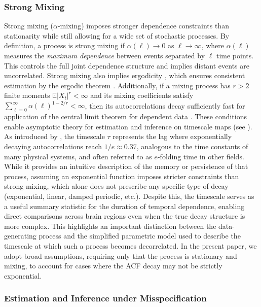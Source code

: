 \documentclass[docs/main.tex]{subfiles}
\begin{document}
\subsubsection{Strong Mixing} \label{sec:strong-mixing}
Strong mixing ($\alpha$-mixing) imposes stronger dependence constraints than stationarity while still allowing for a wide set of stochastic processes. By definition, a process is strong mixing if $\alpha(\ell) \rightarrow 0$ as $\ell \rightarrow \infty$, where $\alpha(\ell)$ measures the \emph{maximum dependence} between events separated by $\ell$ time points. This controls the full joint dependence structure and implies distant events are uncorrelated. Strong mixing also implies ergodicity \citep[Chapter~14.12]{hansen_econometrics_2022}, which ensures consistent estimation by the ergodic theorem \citep[Theorem~14.9]{hansen_econometrics_2022}. Additionally, if a mixing process has $r>2$ finite moments $\mathbb{E}|X_t|^r < \infty$ and its mixing coefficients satisfy $\sum_{\ell=0}^{\infty} \alpha(\ell)^{1-2/r} < \infty$, then its autocorrelations decay sufficiently fast for application of the central limit theorem for dependent data \citep[Theorem~14.15]{hansen_econometrics_2022}. These conditions enable asymptotic theory for estimation and inference on timescale maps (see ).\\

As introduced by \citet{murray_hierarchy_2014}, the timescale $\tau$ represents the lag where exponentially decaying autocorrelations reach $1/e \approx 0.37$, analogous to the time constants of many physical systems, and often referred to as $e$-folding time in other fields. While it provides an intuitive description of the memory or persistence of that process, assuming an exponential function imposes stricter constraints than strong mixing, which alone does not prescribe any specific type of decay (exponential, linear, damped periodic, etc.). Despite this, the timescale serves as a useful summary statistic for the duration of temporal dependence, enabling direct comparisons across brain regions even when the true decay structure is more complex. This highlights an important distinction between the data-generating process and the simplified parametric model used to describe the timescale at which such a process becomes decorrelated. In the present paper, we adopt broad assumptions, requiring only that the process is stationary and mixing, to account for cases where the ACF decay may not be strictly exponential.

\subsubsection{Estimation and Inference under Misspecification}\label{sec:misspecification}
\end{document}
